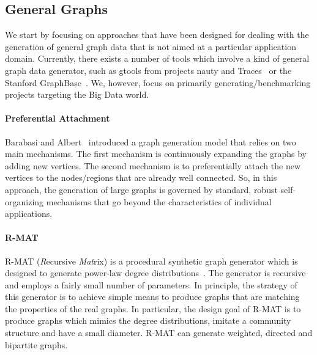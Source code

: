 \subsection{General Graphs}
\label{sec:generators_general}

We start by focusing on approaches that have been designed for dealing with the generation of general graph
data that is not aimed at a particular application domain. Currently, there exists a
number of tools which involve a kind of general graph data generator, such as
gtools from projects nauty and Traces~\cite{gtools} or the Stanford
GraphBase~\cite{GraphBase}. We, however, focus on primarily
generating/benchmarking projects targeting the Big Data world.


\paragraph {Preferential Attachment} Barabasi and Albert~\cite{Barabasi99emergenceScaling} introduced a graph generation model that relies on two main mechanisms. The first mechanism is continuously expanding the graphs by adding new vertices. The second mechanism is to preferentially attach the new vertices   to the nodes/regions that are already well connected. So, in this approach, the generation of large graphs is governed by standard, robust self-organizing mechanisms that go beyond the characteristics of individual applications.

\paragraph {R-MAT} R-MAT (\emph{R}ecursive \emph{Mat}rix) is a procedural synthetic graph generator which is designed to generate power-law degree
distributions~\cite{DBLP:conf/sdm/ChakrabartiZF04}.
The generator is recursive and employs a fairly small number of parameters.
In principle, the strategy of this generator is to achieve simple means to produce graphs that are matching
the properties of the real graphs. In particular, the design goal of R-MAT is to produce graphs which mimics the degree distributions, imitate a community structure and have a small diameter. R-MAT can generate weighted, directed and bipartite graphs.

